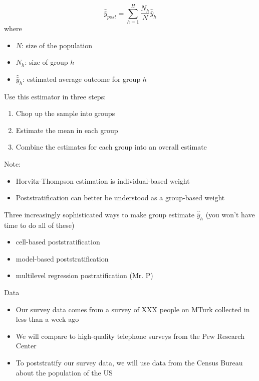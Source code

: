 \documentclass[aspectratio=169]{beamer}
\begin{document}
\begin{frame}

\begin{equation*}
\hat{\bar{y}}_{post} = \sum_{h=1}^H \frac{N_h}{N} \hat{\bar{y}}_h
\end{equation*}
where 
\begin{itemize}
\item $N$: size of the population
\item $N_h$: size of group $h$
\item $\hat{\bar{y}}_h$: estimated average outcome for group $h$
\end{itemize}
\vfill

Use this estimator in three steps:
\begin{enumerate}
\item Chop up the sample into groups \pause
\item Estimate the mean in each group \pause
\item Combine the estimates for each group into an overall estimate
\end{enumerate}

\end{frame}
\begin{frame}

Note:
\begin{itemize}
\item Horvitz-Thompson estimation is individual-based weight
\item Poststratification can better be understood as a group-based weight
\end{itemize}

\end{frame}
\begin{frame}

Three increasingly sophisticated ways to make group estimate $\hat{\bar{y}}_h$ (you won't have time to do all of these)
\begin{itemize}
\item cell-based poststratification
\item model-based poststratification
\item multilevel regression postratification (Mr. P)
\end{itemize}

\end{frame}
\begin{frame}{Data}

\begin{itemize}
\item Our survey data comes from a survey of XXX people on MTurk collected in less than a week ago
\item We will compare to high-quality telephone surveys from the Pew Research Center
\item To poststratify our survey data, we will use data from the Census Bureau about the population of the US
\end{itemize}

\end{frame}
\end{document}
